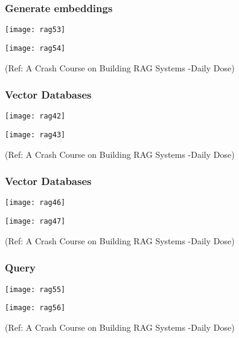 \begin{frame}[fragile]\frametitle{Generate embeddings}



		\begin{center}
		\texttt{[image: rag53]}
		
		\texttt{[image: rag54]}
		
		\end{center}

{\tiny (Ref: A Crash Course on Building RAG Systems -Daily Dose)}


\end{frame}

\begin{frame}[fragile]\frametitle{Vector Databases}


		\begin{center}
		\texttt{[image: rag42]}
		
		\texttt{[image: rag43]}
		
		\end{center}

{\tiny (Ref: A Crash Course on Building RAG Systems -Daily Dose)}

\end{frame}

\begin{frame}[fragile]\frametitle{Vector Databases}


		\begin{center}
		\texttt{[image: rag46]}
		
		\texttt{[image: rag47]}
		
		\end{center}

{\tiny (Ref: A Crash Course on Building RAG Systems -Daily Dose)}

\end{frame}

\begin{frame}[fragile]\frametitle{Query}



		\begin{center}
		\texttt{[image: rag55]}
		
		\texttt{[image: rag56]}
		
		\end{center}

{\tiny (Ref: A Crash Course on Building RAG Systems -Daily Dose)}


\end{frame}

